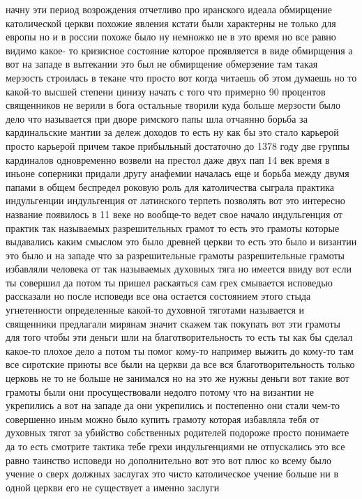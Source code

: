 начну эти период возрождения отчетливо про иранского идеала обмирщение
католической церкви похожие явления кстати были характерны не только для европы
но и в россии похоже было ну немножко не в это время но все равно видимо какое-
то кризисное состояние которое проявляется в виде обмирщения а вот на западе в
вытекании это был не обмирщение обмерзение там такая мерзость строилась в текане
что просто вот когда читаешь об этом думаешь но то какой-то высшей степени
цинизу начать с того что примерно 90 процентов священников не верили в бога
остальные творили куда больше мерзости было дело что называется при дворе
римского папы шла отчаянно борьба за кардинальские мантии за дележ доходов то
есть ну как бы это стало карьерой просто карьерой причем такое прибыльный
достаточно до 1378 году две группы кардиналов одновременно возвели на престол
даже двух пап 14 век время в иньоне соперники придали другу анафемии началась
еще и борьба между двумя папами в общем беспредел роковую роль для католичества
сыграла практика индульгенции индульгенция от латинского терпеть позволять вот
это интересно название появилось в 11 веке но вообще-то ведет свое начало
индульгенция от практик так называемых разрешительных грамот то есть это грамоты
которые выдавались каким смыслом это было древней церкви то есть это было и
византии это было и на западе что за разрешительные грамоты разрешительные
грамоты избавляли человека от так называемых духовных тяга но имеется ввиду вот
если ты совершил да потом ты пришел раскаяться сам грех смывается исповедью
рассказали но после исповеди все она остается состоянием этого стыда
угнетенности определенные какой-то духовной тяготами называется и священники
предлагали мирянам значит скажем так покупать вот эти грамоты для того чтобы эти
деньги шли на благотворительность то есть ты как бы сделал какое-то плохое дело
а потом ты помог кому-то например выжить до кому-то там все сиротские приюты все
были на церкви да все вся благотворительность только церковь не то не больше не
занимался но на это же нужны деньги вот такие вот грамоты были они
просуществовали недолго потому что на византии не укрепились а вот на западе да
они укрепились и постепенно они стали чем-то совершенно иным можно было купить
грамоту которая избавляла тебя от духовных тягот за убийство собственных
родителей подороже просто понимаете да то есть смотрите тактика тебе грехи
индульгенциями не отпускались это все равно таинство исповеди но дополнительно
вот это вот плюс ко всему было учение о сверх должных заслугах это чисто
католическое учение больше ни в одной церкви его не существует а именно заслуги
